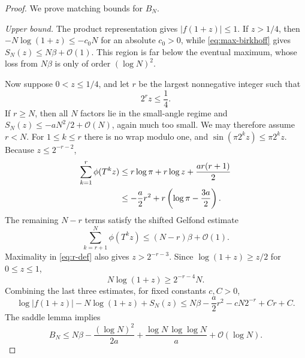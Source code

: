 \documentclass[11pt,oneside]{article}
\theoremstyle{definition}
\theoremstyle{remark}
\newcommand{\bigO}{\mathcal O}
\newcommand{\T}{T}
\begin{document}
\begin{proof}
We prove matching bounds for $B_N$.

\emph{Upper bound.}
The product representation gives $|f(1+z)|\le1$.  If $z>1/4$, then
$-N\log(1+z)\le-c_0N$ for an absolute $c_0>0$, while
\eqref{eq:max-birkhoff} gives $S_N(z)\le N\beta+\bigO(1)$.
This region is far below the eventual maximum, whose loss from $N\beta$ is
only of order $(\log N)^2$.

Now suppose $0<z\le1/4$, and let $r$ be the largest nonnegative integer such
that
\begin{equation}
 2^rz\le\frac14.                                            \label{eq:r-def}
\end{equation}
If $r\ge N$, then all $N$ factors lie in the small-angle regime and
$S_N(z)\le-aN^2/2+\bigO(N)$, again much too small.  We may therefore assume
$r<N$.  For $1\le k\le r$ there is no wrap modulo one, and
$\sin(\pi2^kz)\le\pi2^kz$.  Because
$z\le2^{-r-2}$,
\begin{align}
 \sum_{k=1}^{r}\phi(\T^kz)
 &\le r\log\pi+r\log z+\frac{ar(r+1)}2\notag\\
 &\le-\frac a2r^2+r\left(\log\pi-\frac{3a}{2}\right).     \label{eq:transient-upper}
\end{align}
The remaining $N-r$ terms satisfy the shifted Gelfond estimate
\[
 \sum_{k=r+1}^{N}\phi(\T^kz)
 \le(N-r)\beta+\bigO(1).
\]
Maximality in \eqref{eq:r-def} also gives $z>2^{-r-3}$.  Since
$\log(1+z)\ge z/2$ for $0\le z\le1$,
\[
 N\log(1+z)\ge2^{-r-4}N.
\]
Combining the last three estimates, for fixed constants $c,C>0$,
\begin{equation}
 \log|f(1+z)|-N\log(1+z)+S_N(z)
 \le N\beta-\frac a2r^2-cN2^{-r}+Cr+C.                    \label{eq:BN-upper-r}
\end{equation}
The saddle lemma implies
\begin{equation}
 B_N\le N\beta-
\frac{(\log N)^2}{2a}
 +\frac{\log N\,\log\log N}{a}+\bigO(\log N).             \label{eq:BN-upper}
\end{equation}


\end{proof}
\end{document}
